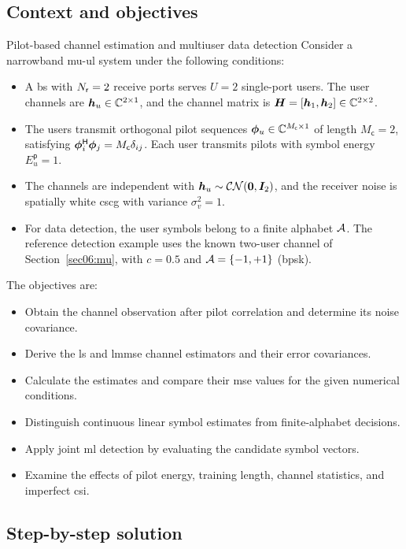 \subsection{Context and objectives}
\begin{example}{Pilot-based channel estimation and multiuser data detection}
	Consider a narrowband \ac{mu}-\ac{ul} system under the following conditions:
	\begin{itemize}
		\item A \ac{bs} with $N_{\mathsf{r}}=2$ receive ports serves $U=2$ single-port users. The user channels are $\bm{h}_u\in\mathbb{C}^{2\times1}$, and the channel matrix is $\bm{H}=[\bm{h}_1,\bm{h}_2]\in\mathbb{C}^{2\times2}$.
		\item The users transmit orthogonal pilot sequences $\bm{\phi}_u\in\mathbb{C}^{M_{\mathsf c}\times1}$ of length $M_{\mathsf c}=2$, satisfying ${\bm{\phi}}^{\mathsf{H}}_i\bm{\phi}_j=M_{\mathsf c}\delta_{ij}$. Each user transmits pilots with symbol energy $E_u^{\mathsf p}=1$.
		\item The channels are independent with $\bm{h}_u\sim\mathcal{CN}(\bm{0},\bm{I}_2)$, and the receiver noise is spatially white \ac{cscg} with variance $\sigma_v^2=1$.
		\item For data detection, the user symbols belong to a finite alphabet $\mathcal{A}$. The reference detection example uses the known two-user channel of Section~\ref{sec06:mu}, with $c=0.5$ and $\mathcal{A}=\{-1,+1\}$ (\ac{bpsk}).
	\end{itemize}
	
	The objectives are:
	\begin{itemize}
		\item Obtain the channel observation after pilot correlation and determine its noise covariance.
		\item Derive the \ac{ls} and \ac{lmmse} channel estimators and their error covariances.
		\item Calculate the estimates and compare their \ac{mse} values for the given numerical conditions.
		\item Distinguish continuous linear symbol estimates from finite-alphabet decisions.
		\item Apply joint \ac{ml} detection by evaluating the candidate symbol vectors.
		\item Examine the effects of pilot energy, training length, channel statistics, and imperfect \ac{csi}.
	\end{itemize}
\end{example}

\subsection{Step-by-step solution}

